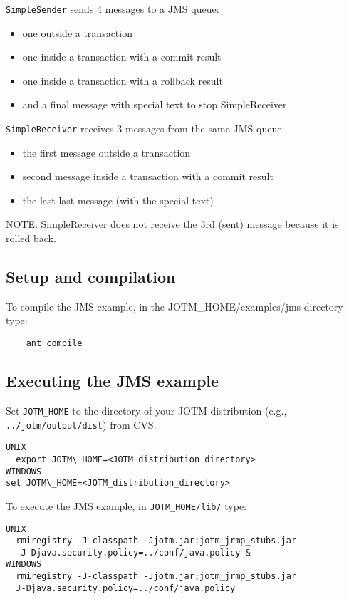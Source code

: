 \documentclass[a4paper,11pt]{article}
\begin{document}
\noindent \texttt{SimpleSender} sends 4 messages to a JMS queue:
\begin{itemize}
\item one outside a transaction
\item one inside a transaction with a commit result
\item one inside a transaction with a rollback result
\item and a final message with special text to stop SimpleReceiver
\end{itemize}

\noindent \texttt{SimpleReceiver} receives 3 messages from the same JMS queue:
\begin{itemize}
\item the first message outside a transaction
\item second message inside a transaction with a commit result
\item the last last message (with the special text)
\end{itemize}

\noindent NOTE: SimpleReceiver does not receive the 3rd (sent) message
  because it is rolled back.

\subsection{Setup and compilation}
\label{sec:jms_setup}

To compile the JMS example, in the JOTM\_HOME/examples/jms directory type:
\begin{verbatim}
    ant compile
\end{verbatim}

\subsection{Executing the JMS example}
\label{sec:jms_run}
Set \texttt{JOTM\_HOME} to the directory of your JOTM distribution (e.g.,
\texttt{../jotm/output/dist}) from CVS.
\begin{verbatim}
UNIX
  export JOTM\_HOME=<JOTM_distribution_directory>
WINDOWS
set JOTM\_HOME=<JOTM_distribution_directory>
\end{verbatim}

\noindent To execute the JMS example, in \texttt{JOTM\_HOME/lib/} type: 
\begin{verbatim}
UNIX
  rmiregistry -J-classpath -Jjotm.jar:jotm_jrmp_stubs.jar  
  -J-Djava.security.policy=../conf/java.policy &
WINDOWS
  rmiregistry -J-classpath -Jjotm.jar;jotm_jrmp_stubs.jar 
  J-Djava.security.policy=../conf/java.policy
\end{verbatim}
\end{document}
